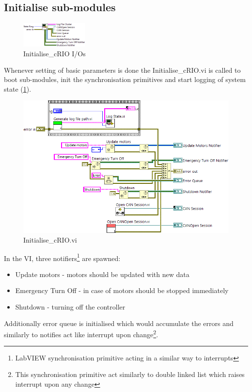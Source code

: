 \subsection{Initialise sub-modules}
\begin{figure}
    \vspace{-15pt}
    \centering
    \includegraphics[scale=\visc,max width=0.3\textwidth]{figures/Initialise_cRIOc}
    \caption*{Initialise\_cRIO I/Os}
    \vspace{-15pt}
\end{figure}
Whenever setting of basic parameters is done the Initialise\_cRIO.vi is called to boot sub-modules, init the synchronisation primitives and start logging of system state (\ref{vi:init_criod}).
\begin{figure}[!h]
    \centering
    \includegraphics[scale=\visc,max width=\textwidth]{figures/Initialise_cRIOd.png}
    \caption{Initialise\_cRIO.vi}
    \label{vi:init_criod}
\end{figure}

In the VI, three notifiers\footnote{LabVIEW synchronisation primitive acting in a similar way to interrupts} are spawned:
\begin{itemize}
    \item Update motors - motors should be updated with new data
    \item Emergency Turn Off - in case of motors should be stopped immediately
    \item Shutdown - turning off the controller
\end{itemize}
Additionally error queue is initialised which would accumulate the errors and similarly to notifies act like interrupt upon change\footnote{This synchronisation primitive act similarly to double linked list which raises interrupt upon any change}.

